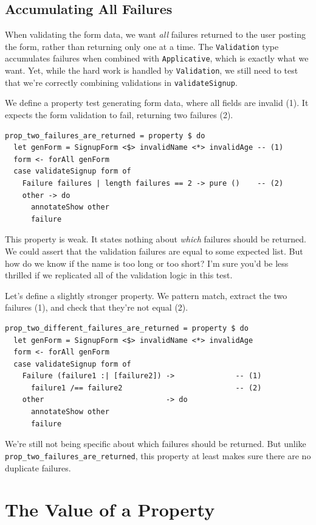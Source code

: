 \subsection{Accumulating All
Failures}\label{accumulating-all-failures}

When validating the form data, we want \emph{all} failures returned to
the user posting the form, rather than returning only one at a time. The
\texttt{Validation} type accumulates failures when combined with
\texttt{Applicative}, which is exactly what we want. Yet, while the hard
work is handled by \texttt{Validation}, we still need to test that we're
correctly combining validations in \texttt{validateSignup}.

We define a property test generating form data, where all fields are
invalid (1). It expects the form validation to fail, returning two
failures (2).

\begin{verbatim}
prop_two_failures_are_returned = property $ do
  let genForm = SignupForm <$> invalidName <*> invalidAge -- (1)
  form <- forAll genForm
  case validateSignup form of
    Failure failures | length failures == 2 -> pure ()    -- (2)
    other -> do
      annotateShow other
      failure
\end{verbatim}
This property is weak. It states nothing about \emph{which} failures
should be returned. We could assert that the validation failures are
equal to some expected list. But how do we know if the name is too long
or too short? I'm sure you'd be less thrilled if we replicated all of
the validation logic in this test.

Let's define a slightly stronger property. We pattern match, extract the
two failures (1), and check that they're not equal (2).

\begin{verbatim}
prop_two_different_failures_are_returned = property $ do
  let genForm = SignupForm <$> invalidName <*> invalidAge
  form <- forAll genForm
  case validateSignup form of
    Failure (failure1 :| [failure2]) ->              -- (1)
      failure1 /== failure2                          -- (2)
    other                            -> do
      annotateShow other
      failure
\end{verbatim}
We're still not being specific about which failures should be returned.
But unlike \texttt{prop\_two\_failures\_\-are\_\-returned}, this property at
least makes sure there are no duplicate failures.

\section{The Value of a Property}\label{the-value-of-a-property}

